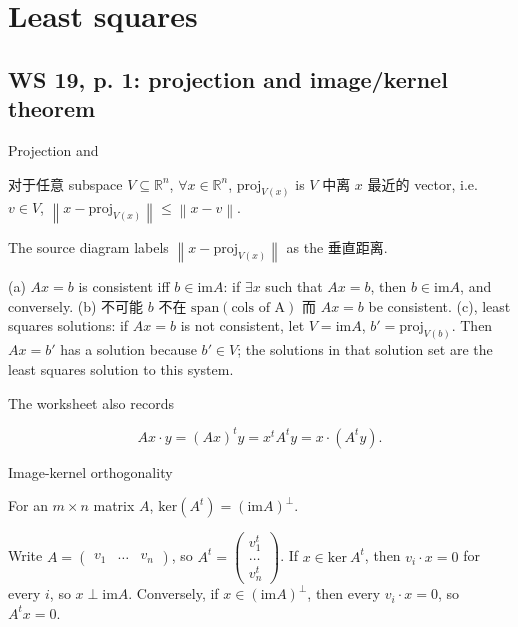 \chapter{Least squares}

\section{WS 19, p. 1: projection and image/kernel theorem}

\begin{theorem}{Projection and }

对于任意 subspace \(V \subseteq \mathbb{R}^{n}\), \(\forall x \in \mathbb{R}^{n}\), \(\text{proj}_{V{(x)}}\) is \(V\) 中离 \(x\) 最近的 vector, i.e. \(v \in V\), \(\left\| {x - \text{proj}_{V{(x)}}} \right\| \leq \left\| {x - v} \right\|\).

\end{theorem}

The source diagram labels \(\left\| {x - \text{proj}_{V{(x)}}} \right\|\) as the 垂直距离.

(a) \(Ax = b\) is consistent iff \(b \in \text{im}A\): if \(\exists x\) such that \(Ax = b\), then \(b \in \text{im}A\), and conversely. (b) 不可能 \(b\) 不在 \(\text{span}\left( \text{cols of A} \right)\) 而 \(Ax = b\) be consistent. (c), least squares solutions: if \(Ax = b\) is not consistent, let \(V = \text{im}A\), \(b' = \text{proj}_{V{(b)}}\). Then \(Ax = b'\) has a solution because \(b' \in V\); the solutions in that solution set are the least squares solution to this system.

The worksheet also records

\[Ax \cdot y = \left( {Ax} \right)^{t}y = x^{t}A^{t}y = x \cdot \left( {A^{t}y} \right).\]

\begin{theorem}{Image-kernel orthogonality}

For an \(m \times n\) matrix \(A\), \(\text{ker}\left( A^{t} \right) = \left( {\text{im}A} \right)^{\perp}\).

\end{theorem}

Write \(A = \begin{pmatrix}
v_{1} & \ldots & v_{n}
\end{pmatrix}\), so \(A^{t} = \begin{pmatrix}
v_{1}^{t} \\
\ldots \\
v_{n}^{t}
\end{pmatrix}\). If \(x \in \text{ker}\ A^{t}\), then \(v_{i} \cdot x = 0\) for every \(i\), so \(x \perp \text{im}A\). Conversely, if \(x{\in \left( {\text{im}A} \right)}^{\perp}\), then every \(v_{i} \cdot x = 0\), so \(A^{t}x = 0\).


